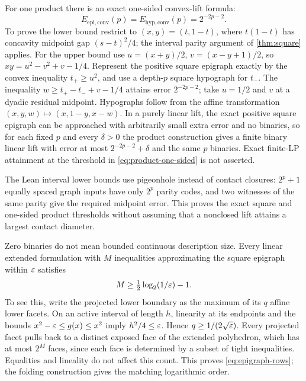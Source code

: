 For one product there is an exact one-sided convex-lift formula:
\begin{equation}\label{eq:product-one-sided}
 E_{\mathrm{epi,conv}}(p)=E_{\mathrm{hyp,conv}}(p)=2^{-2p-2}.
\end{equation}
To prove the lower bound restrict to $(x,y)=(t,1-t)$, where
$t(1-t)$ has concavity midpoint gap $(s-t)^2/4$; the interval parity
argument of \cref{thm:square} applies. For the upper bound use
$u=(x+y)/2$, $v=(x-y+1)/2$, so
$xy=u^2-v^2+v-1/4$. Represent the positive square epigraph exactly by
the convex inequality $t_+\ge u^2$, and use a depth-$p$ square
hypograph for $t_-$. The inequality
$w\ge t_+-t_-+v-1/4$ attains error $2^{-2p-2}$; take $u=1/2$ and
$v$ at a dyadic residual midpoint. Hypographs follow from the affine
transformation $(x,y,w)\mapsto(x,1-y,x-w)$. In a purely linear lift,
the exact positive square epigraph can be approached with arbitrarily
small extra error and no binaries, so for each fixed $p$ and every
$\delta>0$ the product construction gives a finite binary linear lift
with error at most
$2^{-2p-2}+\delta$ and the same $p$ binaries. Exact finite-LP attainment
at the threshold in \eqref{eq:product-one-sided} is not asserted.

The Lean interval lower bounds use pigeonhole instead of contact
closures: $2^p+1$ equally spaced graph inputs have only $2^p$ parity
codes, and two witnesses of the same parity give the required midpoint
error. This proves the exact square and one-sided product thresholds
without assuming that a nonclosed lift attains a largest contact
diameter.

Zero binaries do not mean bounded continuous description size. Every
linear extended formulation with $M$ inequalities approximating the
square epigraph within $\varepsilon$ satisfies
\begin{equation}\label{eq:epigraph-rows}
 M\ge\tfrac12\log_2(1/\varepsilon)-1.
\end{equation}
To see this, write the projected lower boundary as the maximum of its
$q$ affine lower facets. On an active interval of length $h$, linearity
at its endpoints and the bounds $x^2-\varepsilon\le g(x)\le x^2$ imply
$h^2/4\le\varepsilon$. Hence $q\ge1/(2\sqrt{\varepsilon})$. Every projected facet
pulls back to a distinct exposed face of the extended polyhedron, which
has at most $2^M$ faces, since each face is determined by a subset of
tight inequalities. Equalities and lineality do not affect this count.
This proves \eqref{eq:epigraph-rows}; the folding construction gives
the matching logarithmic order.

